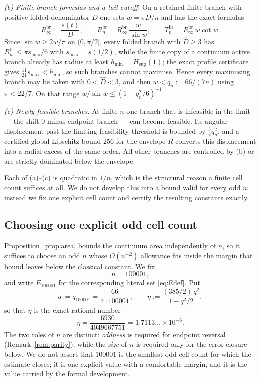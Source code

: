\documentclass[11pt]{article}
\theoremstyle{plain}
\theoremstyle{definition}
\theoremstyle{remark}
\newcommand{\Hsup}{H_{\mathrm{sup}}}
\begin{document}
\emph{(b) Finite branch formulas and a tail cutoff.} On a retained finite branch
with positive folded denominator $D$ one sets $w=\pi D/n$ and has the exact
formulas
\begin{equation}\label{eq:finitebranch}
  R^{\mathrm{br}}_{\infty}=\frac{s(t)}{D},
  \qquad
  R^{\mathrm{br}}_{n}=R^{\mathrm{br}}_{\infty}\,\frac{w}{\sin w},
  \qquad
  T^{\mathrm{br}}_{n}=R^{\mathrm{br}}_{\infty}\,w\cot w .
\end{equation}
Since $\sin w\ge 2w/\pi$ on $(0,\pi/2]$, every folded branch with
$\widehat D\ge3$ has $R^{\mathrm{br}}_{n}\le\pi s_{\max}/6$ with
$s_{\max}=s(1/2)$, while the finite copy of a continuum active branch already
has radius at least $h_{\min}=\Hsup(1)$; the exact profile certificate gives
$\tfrac{11}{21}s_{\max}<h_{\min}$, so such branches cannot maximise. Hence every
maximising branch may be taken with $0<\widehat D<3$, and then
$w<q_{n}:=66/(7n)$ using $\pi<22/7$. On that range $w/\sin w\le(1-q_{n}^{2}/6)^{-1}$.

\emph{(c) Newly feasible branches.} At finite $n$ one branch that is infeasible
in the limit --- the shift-$0$ minus endpoint branch --- can become feasible. Its
angular displacement past the limiting feasibility threshold is bounded by
$\tfrac34q_{n}^{2}$, and a certified global Lipschitz bound $256$ for the
envelope $R$ converts this displacement into a radial excess of the same order.
All other branches are controlled by (b) or are strictly dominated below the
envelope.

Each of (a)--(c) is quadratic in $1/n$, which is the structural reason a finite
cell count suffices at all. We do not develop this into a bound valid for every
odd $n$; instead we fix one explicit cell count and certify the resulting
constants exactly.

\subsection{Choosing one explicit odd cell count}

Proposition~\ref{prop:area} bounds the continuum area independently of $n$, so
it suffices to choose an odd $n$ whose $O(n^{-2})$ allowance fits inside the
margin that bound leaves below the classical constant. We fix
\[
  n=100001 ,
\]
and write $E_{100001}$ for the corresponding literal set \eqref{eq:Edef}. Put
\begin{equation}\label{eq:qeta}
  q:=q_{100001}=\frac{66}{7\cdot100001},
  \qquad
  \eta:=\frac{(385/2)\,q^{2}}{1-q^{2}/2},
\end{equation}
so that $\eta$ is the exact rational number
\begin{equation}\label{eq:etaval}
  \eta=\frac{6930}{4049667751}=1.7113\ldots\times10^{-6}.
\end{equation}
The two roles of $n$ are distinct: \emph{oddness} is required for endpoint
reversal (Remark~\ref{rem:parity}), while the \emph{size} of $n$ is required
only for the error closure below. We do not assert that $100001$ is the smallest
odd cell count for which the estimate closes; it is one explicit value with a
comfortable margin, and it is the value carried by the formal development.
\end{document}
